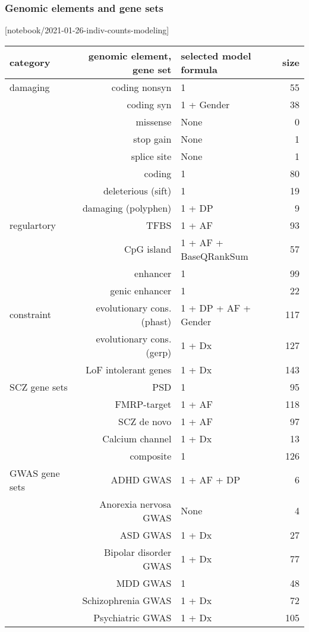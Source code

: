 \documentclass[letterpaper]{article}
\begin{document}
\subsubsection*{Genomic elements and gene sets}

[notebook/2021-01-26-indiv-counts-modeling]


\begin{tabular}{lrlr}
category & genomic element, gene set & selected model formula & size \\
\hline
\hline
damaging & coding nonsyn & 1 & 55 \\
& coding syn & 1 + Gender & 38 \\
& missense & None & 0 \\
& stop gain & None & 1 \\
& splice site & None & 1 \\
& coding & 1 & 80 \\
& deleterious (sift) & 1 & 19 \\
& damaging (polyphen) & 1 + DP & 9 \\
\hline
regulartory & TFBS & 1 + AF & 93 \\
& CpG island & 1 + AF + BaseQRankSum & 57 \\
& enhancer & 1 & 99 \\
& genic enhancer & 1 & 22 \\
\hline
constraint & evolutionary cons. (phast) & 1 + DP + AF + Gender & 117 \\
& evolutionary cons. (gerp) & 1 + Dx & 127 \\
& LoF intolerant genes & 1 + Dx & 143 \\
\hline
SCZ gene sets & PSD & 1 & 95 \\
& FMRP-target & 1 + AF & 118 \\
& SCZ de novo & 1 + AF & 97 \\
& Calcium channel & 1 + Dx & 13 \\
& composite & 1 & 126 \\
\hline
GWAS gene sets & ADHD GWAS & 1 + AF + DP & 6 \\
& Anorexia nervosa GWAS & None & 4 \\
& ASD GWAS & 1 + Dx & 27 \\
& Bipolar disorder GWAS & 1 + Dx & 77 \\
& MDD GWAS & 1 & 48 \\
& Schizophrenia GWAS & 1 + Dx & 72 \\
& Psychiatric GWAS & 1 + Dx & 105 \\
\end{tabular}
\end{document}
